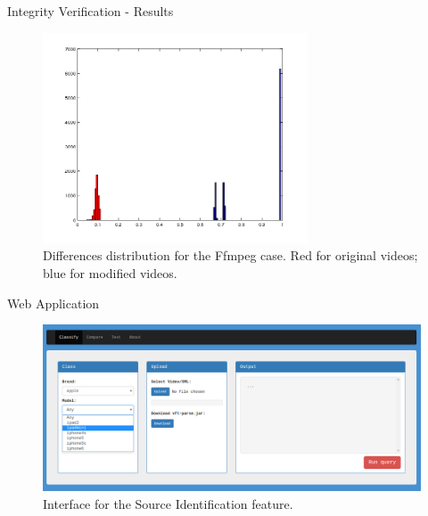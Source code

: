 \begin{tframe}{Integrity Verification - Results}

\begin{figure}
\centering
    \includegraphics[width=0.70\textwidth]{images/ffmpeg-hist.png}
    \caption{Differences distribution for the Ffmpeg case. Red for original videos; blue for modified videos.}
\end{figure}

\end{tframe}

\begin{tframe}{Web Application}

\begin{figure}
\centering
    \includegraphics[width=1\textwidth]{images/webapp.png}
    \caption{Interface for the Source Identification feature.}
\end{figure}

\end{tframe}


